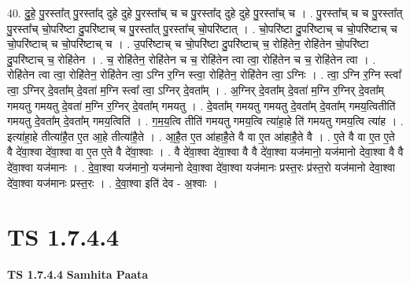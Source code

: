 \documentclass[17pt]{extarticle}
\begin{document}
40. दु॒हे॒ पु॒रस्ता᳚त् पु॒रस्ता᳚द् दुहे दुहे पु॒रस्ता᳚च् च च पु॒रस्ता᳚द् दुहे दुहे पु॒रस्ता᳚च् च । . पु॒रस्ता᳚च् च च पु॒रस्ता᳚त् पु॒रस्ता᳚च् चो॒परि॑ष्टा दु॒परि॑ष्टाच् च पु॒रस्ता᳚त् पु॒रस्ता᳚च् चो॒परि॑ष्टात् । . चो॒परि॑ष्टा दु॒परि॑ष्टाच् च चो॒परि॑ष्टाच् च चो॒परि॑ष्टाच् च चो॒परि॑ष्टाच् च । . उ॒परि॑ष्टाच् च चो॒परि॑ष्टा दु॒परि॑ष्टाच् च॒ रोहि॑तेन॒ रोहि॑तेन चो॒परि॑ष्टा दु॒परि॑ष्टाच् च॒ रोहि॑तेन । . च॒ रोहि॑तेन॒ रोहि॑तेन च च॒ रोहि॑तेन त्वा त्वा॒ रोहि॑तेन च च॒ रोहि॑तेन त्वा । . रोहि॑तेन त्वा त्वा॒ रोहि॑तेन॒ रोहि॑तेन त्वा॒ ऽग्नि र॒ग्नि स्त्वा॒ रोहि॑तेन॒ रोहि॑तेन त्वा॒ ऽग्निः । . त्वा॒ ऽग्नि र॒ग्नि स्त्वा᳚ त्वा॒ ऽग्निर् दे॒वता᳚म् दे॒वता॑ म॒ग्नि स्त्वा᳚ त्वा॒ ऽग्निर् दे॒वता᳚म् । . अ॒ग्निर् दे॒वता᳚म् दे॒वता॑ म॒ग्नि र॒ग्निर् दे॒वता᳚म् गमयतु गमयतु दे॒वता॑ म॒ग्नि र॒ग्निर् दे॒वता᳚म् गमयतु । . दे॒वता᳚म् गमयतु गमयतु दे॒वता᳚म् दे॒वता᳚म् गमय॒त्वितीति॑ गमयतु दे॒वता᳚म् दे॒वता᳚म् गमय॒त्विति॑ । . ग॒म॒य॒त्वि तीति॑ गमयतु गमय॒त्वि त्या॑हा॒हे ति॑ गमयतु गमय॒त्वि त्या॑ह । . इत्या॑हा॒हे तीत्या॑है॒त ए॒त आ॒हे तीत्या॑है॒ते । . आ॒है॒त ए॒त आ॑हाहै॒ते वै वा ए॒त आ॑हाहै॒ते वै । . ए॒ते वै वा ए॒त ए॒ते वै दे॑वा॒श्वा दे॑वा॒श्वा वा ए॒त ए॒ते वै दे॑वा॒श्वाः । . वै दे॑वा॒श्वा दे॑वा॒श्वा वै वै दे॑वा॒श्वा यज॑मानो॒ यज॑मानो देवा॒श्वा वै वै दे॑वा॒श्वा यज॑मानः । . दे॒वा॒श्वा यज॑मानो॒ यज॑मानो देवा॒श्वा दे॑वा॒श्वा यज॑मानः प्रस्त॒रः प्र॑स्त॒रो यज॑मानो देवा॒श्वा दे॑वा॒श्वा यज॑मानः प्रस्त॒रः । . दे॒वा॒श्वा इति॑ देव - अ॒श्वाः । \newline
\pagebreak
{}

\section{ TS 1.7.4.4 }

\textbf{TS 1.7.4.4 } \newline
\textbf{Samhita Paata} \newline
\end{document}
